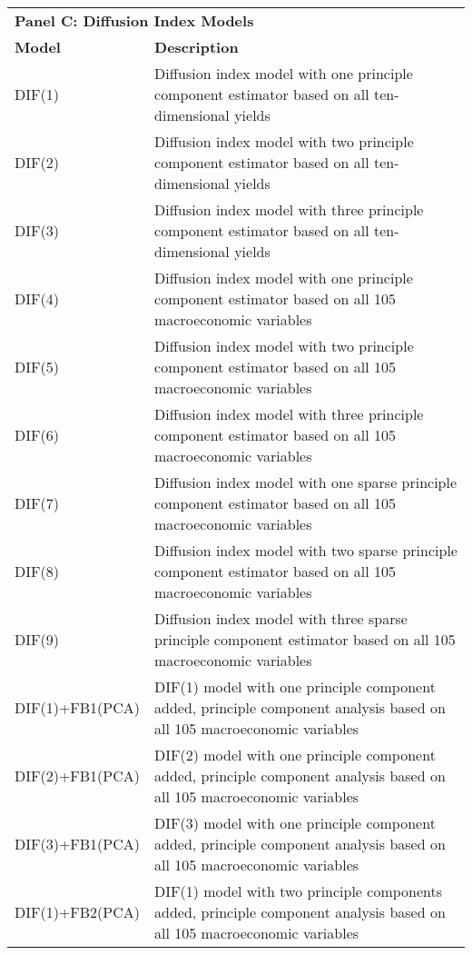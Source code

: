 \begin{footnotesize}
\begin{tabularx}{\linewidth}{lX}
\end{tabularx}
\begin{tabularx}{\linewidth}{lX}
\toprule
\multicolumn{2}{l}{\textbf{Panel C: Diffusion Index Models}} \\
\multicolumn{1}{l}{\textbf{Model}} & \multicolumn{1}{l}{\textbf{Description}} \\ \midrule
\endhead
\bottomrule
\endfoot
DIF(1)                    & Diffusion index model with one principle component estimator based on all ten-dimensional yields \\
DIF(2)                    & Diffusion index model with two principle component estimator based on all ten-dimensional yields \\
DIF(3)                    & Diffusion index model with three principle component estimator based on all ten-dimensional yields \\
DIF(4)                    & Diffusion index model with one principle component estimator based on all 105 macroeconomic variables \\
DIF(5)                    & Diffusion index model with two principle component estimator based on all 105 macroeconomic variables \\
DIF(6)                    & Diffusion index model with three principle component estimator based on all 105 macroeconomic variables \\
DIF(7)                    & Diffusion index model with one sparse principle component estimator based on all 105 macroeconomic variables \\
DIF(8)                    & Diffusion index model with two sparse principle component estimator based on all 105 macroeconomic variables \\
DIF(9)                    & Diffusion index model with three sparse principle component estimator based on all 105 macroeconomic variables \\
DIF(1)+FB1(PCA)           & DIF(1) model with one principle component added, principle component analysis based on all 105 macroeconomic variables \\
DIF(2)+FB1(PCA)           & DIF(2) model with one principle component added, principle component analysis based on all 105 macroeconomic variables \\
DIF(3)+FB1(PCA)           & DIF(3) model with one principle component added, principle component analysis based on all 105 macroeconomic variables \\
DIF(1)+FB2(PCA)           & DIF(1) model with two principle components added, principle component analysis based on all 105 macroeconomic variables \\

\end{tabularx}
\end{footnotesize}
